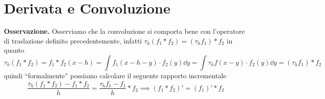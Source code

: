 
	


\section{Derivata e Convoluzione}

\textbf{Osservazione.}
Osserviamo che la convoluzione si comporta bene con l'operatore di traslazione definito precedentemente, infatti $\tau_h (f_1 \ast f_2) = (\tau_h f_1) \ast f_2$ in quanto
$$
	\tau_h(f_1 \ast f_2) =  f_1 \ast f_2 (x - h) 
	= \int f_1(x - h - y) \cdot f_2(y) \dd y = \int \tau_h f(x - y) \cdot f_2(y) \dd y
	= (\tau_h f_1) \ast f_2
$$
quindi ``formalmente'' possiamo calcolare il seguente rapporto incrementale
$$
	\frac{\tau_h(f_1 \ast f_2) - f_1 \ast f_2}{h}
	= \frac{\tau_h f_1 - f_1}{h} \ast f_2
	\implies (f_1 \ast f_2)' = (f_1)' \ast f_2
$$

